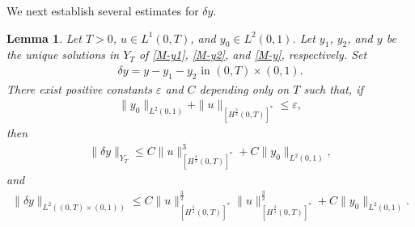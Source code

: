 \documentclass[11pt, reqno]{amsart}
\theoremstyle{plain}
\newtheorem{lemma}[thm]{Lemma}
\numberwithin{equation}{section}
\begin{document}

We next establish several estimates for $\delta y$. 


\begin{lemma}\label{lem-dysmall}  Let $T > 0$, $u \in L^1(0, T)$, and $y_0 \in L^2(0, 1)$. Let $y_1$, $y_2$, and $y$ be the unique solutions in $Y_T$ of \eqref{M-y1}, \eqref{M-y2}, and \eqref{M-y}, respectively. 
Set
\begin{align}
	\delta y = y - y_1 - y_2 \mbox{ in } (0, T) \times (0, 1).
\end{align}
There exist positive constants $\varepsilon$ and $C$ depending only on $T$ such that, if 
\begin{align}
\|y_0\|_{L^2(0, 1)} + \|u\|_{[H^{\frac{3}{4}}(0, T)]^*} \le \varepsilon, 
\end{align}
then
\begin{align}	\label{lem-deltay-1}
	\|\delta y\|_{Y_T} \leq C \|u\|_{[H^{\frac{3}{4}}(0, T)]^*}^3 + C \|y_0\|_{L^2(0, 1)},
\end{align}
and
\begin{align}	\label{lem-deltay-2}
	\| \delta y\|_{L^2((0, T) \times (0, 1))} \leq  C \| u\|_{[H^{\frac{5}{4}}(0, T)]^*}^{\frac{3}{2}} \| u\|_{[H^{\frac{3}{4}}(0, T)]^*}^{\frac{3}{2}} + C \|y_0\|_{L^2(0, 1)}.
\end{align}
\end{lemma}
\end{document}
